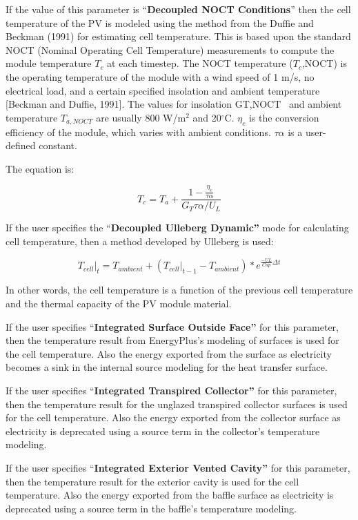 If the value of this parameter is ``\textbf{Decoupled NOCT Conditions}'' then the cell temperature of the PV is modeled using the method from the Duffie and Beckman (1991) for estimating cell temperature. This is based upon the standard NOCT (Nominal Operating Cell Temperature) measurements to compute the module temperature \(T_c\) at each timestep. The NOCT temperature (\(T_c\),NOCT) is the operating temperature of the module with a wind speed of 1 m/s, no electrical load, and a certain specified insolation and ambient temperature {[}Beckman and Duffie, 1991{]}. The values for insolation GT,NOCT ~and ambient temperature \(T_{a,NOCT}\) are usually 800 W/m\(^{2}\) and 20\(^{\circ}\)C. \(\eta_{c}\) is the conversion efficiency of the module, which varies with ambient conditions. \({\tau \alpha}\) is a user-defined constant.

The equation is:

\begin{equation}
  T_c = T_a + \frac{1-\frac{\eta_c}{\tau \alpha}}{G_T \tau\alpha/U_L}
\end{equation}

If the user specifies the ``\textbf{Decoupled Ulleberg Dynamic''} mode for calculating cell temperature, then a method developed by Ulleberg is used:

\begin{equation}
{\left. {{T_{cell}}} \right|_t} = {T_{ambient}} + \left( {{{\left. {{T_{cell}}} \right|}_{t - 1}} - {T_{ambient}}} \right)*{e^{\frac{{ - UL}}{{Cap}}\Delta t}}
\end{equation}

In other words, the cell temperature is a function of the previous cell temperature and the thermal capacity of the PV module material.

If the user specifies ``\textbf{Integrated Surface Outside Face''} for this parameter, then the temperature result from EnergyPlus's modeling of surfaces is used for the cell temperature. Also the energy exported from the surface as electricity becomes a sink in the internal source modeling for the heat transfer surface.

If the user specifies ``\textbf{Integrated Transpired Collector''} for this parameter, then the temperature result for the unglazed transpired collector surfaces is used for the cell temperature. Also the energy exported from the collector surface as electricity is deprecated using a source term in the collector's temperature modeling.

If the user specifies ``\textbf{Integrated Exterior Vented Cavity''} for this parameter, then the temperature result for the exterior cavity is used for the cell temperature. Also the energy exported from the baffle surface as electricity is deprecated using a source term in the baffle's temperature modeling.

